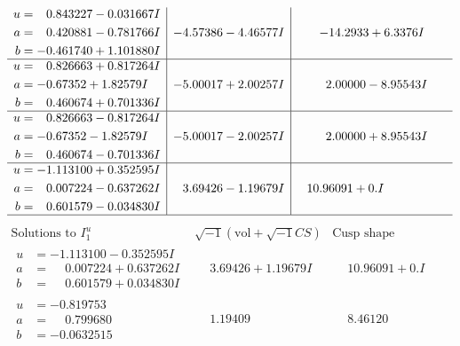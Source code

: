 \documentclass[1p]{elsarticle_modified}
\theoremstyle{definition}
\newcommand{\I}{\sqrt{-1}}
\begin{document}
$$\begin{array}{c|c|c}
\begin{aligned}
u &= \phantom{-}0.843227 - 0.031667 I \\
a &= \phantom{-}0.420881 - 0.781766 I \\
b &= -0.461740 + 1.101880 I\end{aligned}
 & -4.57386 - 4.46577 I & -14.2933 + 6.3376 I \\ \hline\begin{aligned}
u &= \phantom{-}0.826663 + 0.817264 I \\
a &= -0.67352 + 1.82579 I \\
b &= \phantom{-}0.460674 + 0.701336 I\end{aligned}
 & -5.00017 + 2.00257 I & \phantom{-}2.00000 - 8.95543 I \\ \hline\begin{aligned}
u &= \phantom{-}0.826663 - 0.817264 I \\
a &= -0.67352 - 1.82579 I \\
b &= \phantom{-}0.460674 - 0.701336 I\end{aligned}
 & -5.00017 - 2.00257 I & \phantom{-}2.00000 + 8.95543 I \\ \hline\begin{aligned}
u &= -1.113100 + 0.352595 I \\
a &= \phantom{-}0.007224 - 0.637262 I \\
b &= \phantom{-}0.601579 - 0.034830 I\end{aligned}
 & \phantom{-}3.69426 - 1.19679 I & \phantom{-}10.96091 + 0. I\phantom{ +0.000000I}\\
 \hline 
 \end{array}$$\newpage$$\begin{array}{c|c|c}  
\text{Solutions to }I^u_{1}& \I (\text{vol} + \sqrt{-1}CS) & \text{Cusp shape}\\
 \hline 
\begin{aligned}
u &= -1.113100 - 0.352595 I \\
a &= \phantom{-}0.007224 + 0.637262 I \\
b &= \phantom{-}0.601579 + 0.034830 I\end{aligned}
 & \phantom{-}3.69426 + 1.19679 I & \phantom{-}10.96091 + 0. I\phantom{ +0.000000I} \\ \hline\begin{aligned}
u &= -0.819753\phantom{ +0.000000I} \\
a &= \phantom{-}0.799680\phantom{ +0.000000I} \\
b &= -0.0632515\phantom{ +0.000000I}\end{aligned}
 & \phantom{-}1.19409\phantom{ +0.000000I} & \phantom{-}8.46120\phantom{ +0.000000I} \\ \hline\begin{aligned}

\end{aligned}
\end{array}$$
\end{document}
